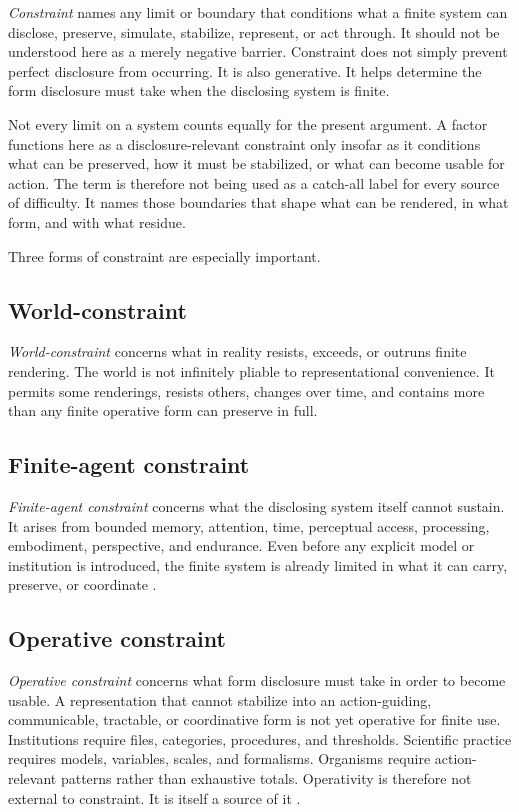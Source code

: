 \documentclass[11pt]{article}
\renewcommand{\emph}[1]{\textit{#1}}
\begin{document}
\emph{Constraint} names any limit or boundary that conditions what a finite system can disclose, preserve, simulate, stabilize, represent, or act through. It should not be understood here as a merely negative barrier. Constraint does not simply prevent perfect disclosure from occurring. It is also generative. It helps determine the form disclosure must take when the disclosing system is finite.

Not every limit on a system counts equally for the present argument. A factor functions here as a disclosure-relevant constraint only insofar as it conditions what can be preserved, how it must be stabilized, or what can become usable for action. The term is therefore not being used as a catch-all label for every source of difficulty. It names those boundaries that shape what can be rendered, in what form, and with what residue.

Three forms of constraint are especially important.

\subsection{World-constraint}

\emph{World-constraint} concerns what in reality resists, exceeds, or outruns finite rendering. The world is not infinitely pliable to representational convenience. It permits some renderings, resists others, changes over time, and contains more than any finite operative form can preserve in full.

\subsection{Finite-agent constraint}

\emph{Finite-agent constraint} concerns what the disclosing system itself cannot sustain. It arises from bounded memory, attention, time, perceptual access, processing, embodiment, perspective, and endurance. Even before any explicit model or institution is introduced, the finite system is already limited in what it can carry, preserve, or coordinate \cite{Wheeler2024BoundedRationalitySEP,Simon1982ModelsBoundedRationality}.

\subsection{Operative constraint}

\emph{Operative constraint} concerns what form disclosure must take in order to become usable. A representation that cannot stabilize into an action-guiding, communicable, tractable, or coordinative form is not yet operative for finite use. Institutions require files, categories, procedures, and thresholds. Scientific practice requires models, variables, scales, and formalisms. Organisms require action-relevant patterns rather than exhaustive totals. Operativity is therefore not external to constraint. It is itself a source of it \cite{ConantAshby1970GoodRegulator,Ashby1956IntroductionCybernetics}.
\end{document}
